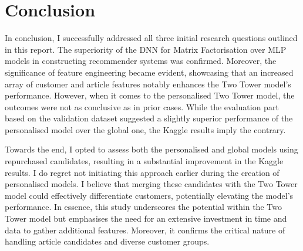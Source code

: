 \documentclass[conference,compsoc]{IEEEtran}
\begin{document}
\section{Conclusion}
In conclusion, I successfully addressed all three initial research questions outlined in this report. The superiority of the DNN for Matrix Factorisation over MLP models in constructing recommender systems was confirmed. Moreover, the significance of feature engineering became evident, showcasing that an increased array of customer and article features notably enhances the Two Tower model's performance. However, when it comes to the personalised Two Tower model, the outcomes were not as conclusive as in prior cases. While the evaluation part based on the validation dataset suggested a slightly superior performance of the personalised model over the global one, the Kaggle results imply the contrary.

Towards the end, I opted to assess both the personalised and global models using repurchased candidates, resulting in a substantial improvement in the Kaggle results. I do regret not initiating this approach earlier during the creation of personalised models. I believe that merging these candidates with the Two Tower model could effectively differentiate customers, potentially elevating the model's performance. In essence, this study underscores the potential within the Two Tower model but emphasises the need for an extensive investment in time and data to gather additional features. Moreover, it confirms the critical nature of handling article candidates and diverse customer groups.



%
%
\end{document}
